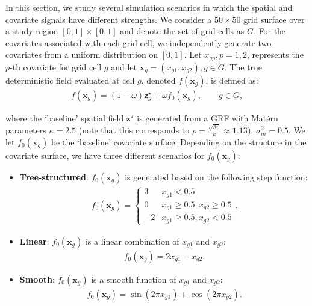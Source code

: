 \documentclass[preprint,12pt,authoryear]{elsarticle}
\begin{document}
{In this section, we study several simulation scenarios in which the spatial and covariate signals have different strengths. We consider a $50 \times 50$ grid surface over a study region $[0,1] \times [0,1]$ and denote the set of grid cells as $G$. For the covariates associated with each grid cell, we independently generate two covariates from a uniform distribution on $[0,1]$. Let $x_{gp}, p = 1,2$, represents the $p$-th covariate for grid cell $g$ and let $\boldsymbol{x}_g=(x_{g1},x_{g2}), g \in G$. The true deterministic field evaluated at cell $g$, denoted $f(\boldsymbol{x}_g)$, is defined as:%
\begin{align*}
	f(\boldsymbol{x}_g) = (1-\omega) \boldsymbol{z}_g^{\star} + \omega f_{0}(\boldsymbol{x}_g), \qquad g \in G,
\end{align*}
{
where the `baseline' spatial field $\boldsymbol{z}^{\star}$ is generated from a GRF with Mat\'ern parameters $\kappa = 2.5$ (note that this corresponds to $\rho = \frac{\sqrt{8\upsilon}}{\kappa} \approx 1.13$), $\sigma_m^2 = 0.5$. 
We let $f_{0}(\boldsymbol{x}_g)$ be the `baseline' covariate surface. Depending on the structure in the covariate surface, we  have three different scenarios for $f_{0}(\boldsymbol{x}_g)$:
\begin{itemize}
    \item \textbf{Tree-structured}: $f_{0}(\boldsymbol{x}_g)$ is generated based on the following step function: 
    \begin{align*}
    f_{0}(\boldsymbol{x}_g) = \begin{cases}
    3 & x_{g1} < 0.5 \\
    0 & x_{g1}\geq 0.5, x_{g2} \geq 0.5 \\
    -2 & x_{g1}\geq 0.5, x_{g2} < 0.5
    \end{cases}.
    \end{align*}
    \item \textbf{Linear}: $f_{0}(\boldsymbol{x}_g)$ is a linear combination of $x_{g1}$ and $x_{g2}$:
    \begin{align*}
        f_{0}(\boldsymbol{x}_g) =2x_{g1} - x_{g2}.
    \end{align*}
    \item \textbf{Smooth}:  $f_{0}(\boldsymbol{x}_g)$ is a smooth function of $x_{g1}$ and $x_{g2}$:
    \begin{align*}
        f_{0}(\boldsymbol{x}_g) =\sin(2\pi x_{g1}) + \cos(2 \pi x_{g2}) .
    \end{align*}
\end{itemize}
}}
\end{document}

